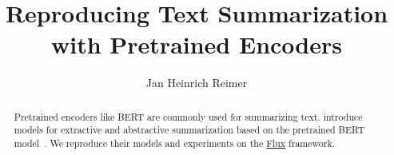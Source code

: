 \documentclass[english,sigconf,nonacm,natbib=false,balance=false,screen,review]{acmart}
\title{Reproducing Text Summarization with Pretrained Encoders}
\author{Jan Heinrich Reimer}
\affiliation{
    \institution{Martin Luther University Halle-Wittenberg}
    \streetaddress{Von-Seckendorff-Platz~1}
    \postcode{06108}
    \city{Halle (Saale)}
    \country{Germany}
}
\begin{document}
\begin{abstract}
    Pretrained encoders like BERT are commonly used for summarizing text. \citeauthor{DBLP:conf/emnlp/LiuL19} introduce models for extractive and abstractive summarization based on the pretrained BERT model~\cite{DBLP:conf/emnlp/LiuL19}.
    We reproduce their models and experiments on the \href{https://fluxml.ai/}{Flux} framework.
\end{abstract}

\maketitle







\printbibliography
\end{document}

